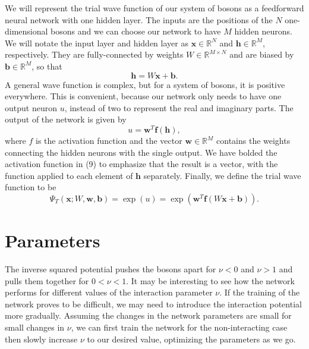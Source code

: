 \documentclass[prb,aps,twocolumn,showpacs,10pt]{revtex4-1}
\begin{document}
We will represent the trial wave function of our system of bosons as a feedforward neural network with one hidden layer. The inputs are the positions of the $N$ one-dimensional bosons and we can choose our network to have $M$ hidden neurons. We will notate the input layer and hidden layer as $\bm{x}\in\mathbb{R}^N$ and $\bm{h}\in\mathbb{R}^M$, respectively. They are fully-connected by weights $W \in \mathbb{R}^{M\times N}$ and are biased by $\bm{b}\in\mathbb{R}^M$, so that
\begin{equation}
\bm{h}=W\bm{x}+\bm{b}.
\end{equation}
A general wave function is complex, but for a system of bosons, it is positive everywhere. This is convenient, because our network only needs to have one output neuron $u$, instead of two to represent the real and imaginary parts. The output of the network is given by
 \begin{equation}
 u = \bm{w}^T \bm{f}(\bm{h}),
 \end{equation}
 where $f$ is the activation function and the vector $\bm{w}\in\mathbb{R}^M$ contains the weights connecting the hidden neurons with the single output. We have bolded the activation function in (9) to emphasize that the result is a vector, with the function applied to each element of $\bm{h}$ separately. Finally, we define the trial wave function to be 
 \begin{equation}
 \Psi_T(\bm{x};W, \bm{w}, \bm{b}) = \exp (u) = \exp(\bm{w}^T \bm{f}(W\bm{x}+\bm{b})).
 \end{equation}
 
 \iffalse
 A diagram of the network is shown in FIG. 1. 
\begin{figure}
\begin{overpic}[scale=0.4]{FFNN.png}
\put(14,87){$x_1$}
\put(14,70){$x_2$}
\put(11.5,30){$x_{N-1}$}
\put(14,12){$x_N$}
\put(48,87){$h_1$}
\put(48,70){$h_2$}
\put(45.5,30){$h_{M-1}$}
\put(47.5,12){$h_M$}
\put(85,49.5){$u$}
\end{overpic}
\caption{Diagram of the feedforward neural network used to represent the trial wave function.}
\end{figure}
\fi


\section{Parameters}
The inverse squared potential pushes the bosons apart for $\nu<0$ and $\nu > 1$ and pulls them together for $0< \nu <1$. It may be interesting to see how the network performs for different values of the interaction parameter $\nu$. If the training of the network proves to be difficult, we may need to introduce the interaction potential more gradually. Assuming the changes in the network parameters are small for small changes in $\nu$, we can first train the network for the non-interacting case then slowly increase $\nu$ to our desired value, optimizing the parameters as we go. 
\end{document}
